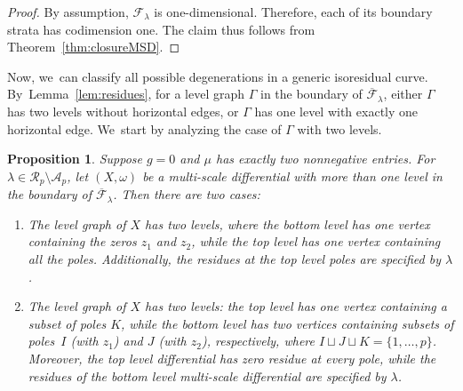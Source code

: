 \documentclass[11pt]{article}
\newtheorem{prop}[thm]{Proposition}
\theoremstyle{definition}
\begin{document}
\begin{proof}
By assumption, $\mathcal F_{\lambda}$ is one-dimensional. Therefore, each of its boundary strata has codimension one. The claim thus follows from Theorem~\ref{thm:closureMSD}.
\end{proof}

Now, we~can classify all possible degenerations in a generic isoresidual curve. By~Lemma~\ref{lem:residues}, for a level graph $\Gamma$ in the boundary of $\overline{\mathcal F}_\lambda$, either $\Gamma$ has two levels without horizontal edges, or $\Gamma$ has one level with exactly one horizontal edge. We~start by analyzing the case of $\Gamma$ with two levels.
\begin{prop}
\label{prop:F-boundary}
Suppose $g=0$ and $\mu$ has exactly two nonnegative entries.
For $\lambda \in \mathcal{R}_{p} \setminus \mathcal{A}_{p}$,
let $(X,\omega)$ be a multi-scale differential with more than one level in the boundary of $\overline{\mathcal F}_\lambda$. Then there are two cases:
\begin{enumerate}
\item\label{prop:F-boundary1}
The level graph of $X$ has two levels, where the bottom level has one vertex containing the zeros $z_1$ and $z_2$, while the top level has one vertex containing all the poles. Additionally, the residues at the top level poles are specified by $\lambda$.

\item\label{prop:F-boundary2}
The level graph of $X$ has two levels: the top level has one vertex containing a subset of poles $K$, while the bottom level has two vertices containing subsets of poles~$I$ (with $z_1$) and $J$ (with $z_2$), respectively, where $I\sqcup J \sqcup K = \{1, \ldots, p\}$. Moreover, the top level differential has zero residue at every pole, while the residues of the bottom level multi-scale differential are specified by $\lambda$.
\end{enumerate}
\end{prop}
\end{document}
